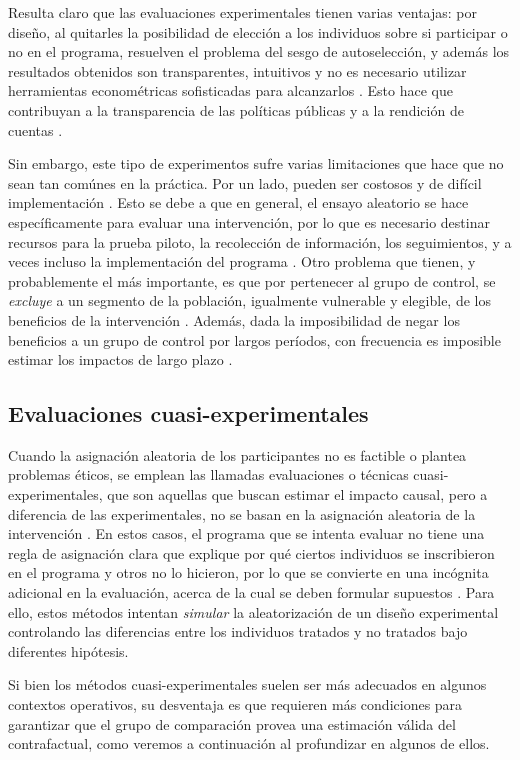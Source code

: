 \documentclass[../../main.tex]{subfiles}
\begin{document}
Resulta claro que las evaluaciones experimentales tienen varias ventajas: por diseño, al
quitarles la posibilidad de elección a los individuos sobre si participar o no en el
programa, resuelven el problema del sesgo de autoselección, y además los resultados obtenidos
son transparentes, intuitivos y no es necesario utilizar herramientas econométricas
sofisticadas para alcanzarlos \cite{bernal}. Esto hace que contribuyan a la transparencia
de las políticas públicas y a la rendición de cuentas \cite{bernal}.

Sin embargo, este tipo de experimentos sufre varias limitaciones que hace que no sean tan
comúnes en la práctica. Por un lado, pueden ser costosos y de difícil implementación
\cite{bernal}. Esto se debe a que en general, el ensayo aleatorio se hace específicamente
para evaluar una intervención, por lo que es necesario destinar recursos para la prueba
piloto, la recolección de información, los seguimientos, y a veces incluso la
implementación del programa \cite{bernal}. Otro problema que tienen, y probablemente el
más importante, es que por pertenecer al grupo de control, se \textit{excluye} a un
segmento de la población, igualmente vulnerable y elegible, de los beneficios de la
intervención \cite{bernal}. Además, dada la imposibilidad de negar los beneficios a un
grupo de control por largos períodos, con frecuencia es imposible estimar los impactos de
largo plazo \cite{bernal}.

\subsection{Evaluaciones cuasi-experimentales}
Cuando la asignación aleatoria de los participantes no es factible o plantea problemas
éticos, se emplean las llamadas evaluaciones o técnicas cuasi-experimentales, que son
aquellas que buscan estimar el impacto causal, pero a diferencia de las experimentales, no
se basan en la asignación aleatoria de la intervención \cite{gertler-2016}. En estos
casos, el programa que se intenta evaluar no tiene una regla de asignación clara que
explique por qué ciertos individuos se inscribieron en el programa y otros no lo hicieron,
por lo que se convierte en una incógnita adicional en la evaluación, acerca de la cual se
deben formular supuestos \cite{gertler-2016}. Para ello, estos métodos intentan
\textit{simular} la aleatorización de un diseño experimental controlando las diferencias
entre los individuos tratados y no tratados bajo diferentes hipótesis.

Si bien los métodos cuasi-experimentales suelen ser más adecuados en algunos contextos
operativos, su desventaja es que requieren más condiciones para garantizar que el grupo de
comparación provea una estimación válida del contrafactual, como veremos a continuación al
profundizar en algunos de ellos.
\end{document}
